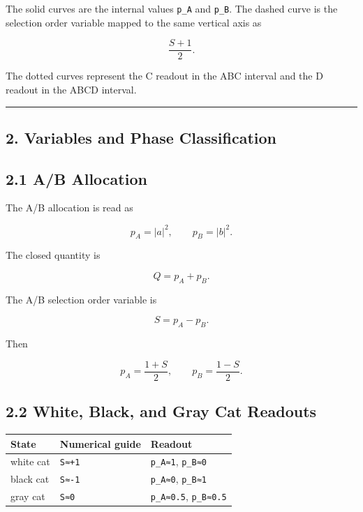 \documentclass{article}
\newcounter{none}
\begin{document}
The solid curves are the internal values \texttt{p\_A} and
\texttt{p\_B}. The dashed curve is the selection order variable mapped
to the same vertical axis as

\[
\frac{S+1}{2}.
\]

The dotted curves represent the C readout in the ABC interval and the D
readout in the ABCD interval.

\begin{center}\rule{0.5\linewidth}{0.5pt}\end{center}

\subsection{2. Variables and Phase
Classification}\label{variables-and-phase-classification}

\subsection{2.1 A/B Allocation}\label{ab-allocation}

The A/B allocation is read as

\[
p_A=|a|^2,\qquad p_B=|b|^2.
\]

The closed quantity is

\[
Q=p_A+p_B.
\]

The A/B selection order variable is

\[
S=p_A-p_B.
\]

Then

\[
p_A=\frac{1+S}{2},
\qquad
p_B=\frac{1-S}{2}.
\]

\subsection{2.2 White, Black, and Gray Cat
Readouts}\label{white-black-and-gray-cat-readouts}

{\def\LTcaptype{none} %
\begin{longtable}[]{@{}lll@{}}
\toprule\noalign{}
State & Numerical guide & Readout \\
\midrule\noalign{}
\endhead
\bottomrule\noalign{}
\endlastfoot
white cat & \texttt{S≈+1} & \texttt{p\_A≈1}, \texttt{p\_B≈0} \\
black cat & \texttt{S≈-1} & \texttt{p\_A≈0}, \texttt{p\_B≈1} \\
gray cat & \texttt{S≈0} & \texttt{p\_A≈0.5}, \texttt{p\_B≈0.5} \\
\end{longtable}
}
\end{document}
